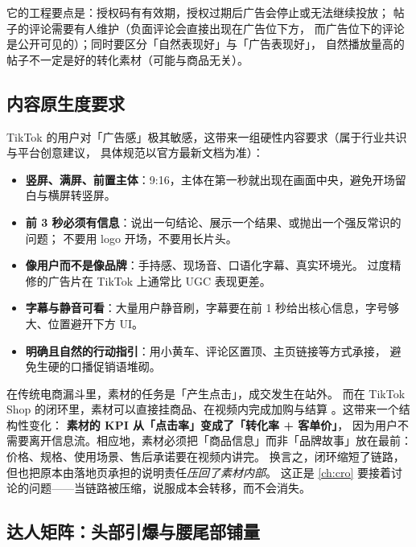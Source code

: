 它的工程要点是：授权码有有效期，授权过期后广告会停止或无法继续投放；
帖子的评论需要有人维护（负面评论会直接出现在广告位下方，
而广告位下的评论是公开可见的）；同时要区分「自然表现好」与「广告表现好」，
自然播放量高的帖子不一定是好的转化素材（可能与商品无关）。

\subsection{内容原生度要求}

TikTok 的用户对「广告感」极其敏感，这带来一组硬性内容要求（属于行业共识与平台创意建议，
具体规范以官方最新文档为准）：

\begin{itemize}
  \item \textbf{竖屏、满屏、前置主体}：9:16，主体在第一秒就出现在画面中央，避免开场留白与横屏转竖屏。
  \item \textbf{前 3 秒必须有信息}：说出一句结论、展示一个结果、或抛出一个强反常识的问题；
        不要用 logo 开场，不要用长片头。
  \item \textbf{像用户而不是像品牌}：手持感、现场音、口语化字幕、真实环境光。
        过度精修的广告片在 TikTok 上通常比 UGC 表现更差。
  \item \textbf{字幕与静音可看}：大量用户静音刷，字幕要在前 1 秒给出核心信息，字号够大、位置避开下方 UI。
  \item \textbf{明确且自然的行动指引}：用小黄车、评论区置顶、主页链接等方式承接，
        避免生硬的口播促销语堆砌。
\end{itemize}

\begin{insight}
在传统电商漏斗里，素材的任务是「产生点击」，成交发生在站外。
而在 TikTok Shop 的闭环里，素材可以直接挂商品、在视频内完成加购与结算
\cite{tiktokshop_about}。这带来一个结构性变化：
\textbf{素材的 KPI 从「点击率」变成了「转化率 + 客单价」}，
因为用户不需要离开信息流。相应地，素材必须把「商品信息」而非「品牌故事」放在最前：
价格、规格、使用场景、售后承诺要在视频内讲完。
换言之，闭环缩短了链路，但也把原本由落地页承担的说明责任\emph{压回了素材内部}。
这正是 \cref{ch:cro} 要接着讨论的问题——当链路被压缩，说服成本会转移，而不会消失。
\end{insight}

\subsection{达人矩阵：头部引爆与腰尾部铺量}

